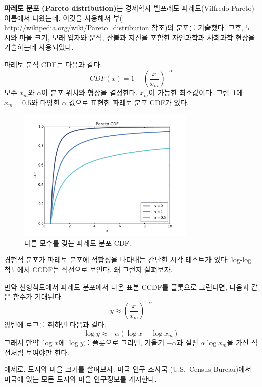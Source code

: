 {\bf 파레토 분포 (Pareto distribution)}는 경제학자 빌프레도 파레토(Vilfredo Pareto) 이름에서 나왔는데, 이것을 사용해서 부(
\url{http://wikipedia.org/wiki/Pareto_distribution} 참조)의 분포를 기술했다.
그후, 도시와 마을 크기, 모래 입자와 운석, 산불과 지진을 포함한 자연과학과 사회과학 현상을 기술하는데 사용되었다.


파레토 분석 CDF는 다음과 같다.
%
\[ CDF(x) = 1 - \left( \frac{x}{x_m} \right) ^{-\alpha} \]
%
모수 $x_{m}$와 $\alpha$이 분포 위치와 형상을 결정한다.
$x_{m}$이 가능한 최소값이다. 
그림~\ref{analytic_pareto_cdf}에 $x_{m} = 0.5$와 
다양한 $\alpha$ 값으로 표현한 파레토 분포 CDF가 있다.

\begin{figure}
\centerline{\includegraphics[height=2.5in]{figs/analytic_pareto_cdf.pdf}}
\caption{다른 모수를 갖는 파레토 분포 CDF.}
\label{analytic_pareto_cdf}
\end{figure}

경험적 분포가 파레토 분포에 적합성을 나타내는 간단한 시각 테스트가 있다: log-log 척도에서 CCDF는 직선으로 보인다. 왜 그런지 살펴보자.

만약 선형척도에서 파레토 분포에서 나온 표본 CCDF를 플롯으로 그린다면, 다음과 같은 함수가 기대된다.
%
\[ y \approx \left( \frac{x}{x_m} \right) ^{-\alpha} \]
%
양변에 로그를 취하면 다음과 같다.
%
\[ \log y \approx -\alpha (\log x - \log x_{m})\]
%
그래서 만약 $\log x$에 $\log y$를 플롯으로 그리면, 
기울기 $-\alpha$과 절편 $\alpha \log x_{m}$을 가진 직선처럼 보여야만 한다.

예제로, 도시와 마을 크기를 살펴보자.
미국 인구 조사국 (U.S.~Census Bureau)에서 미국에 있는 모든 도시와 마을 인구정보를 게시한다.

